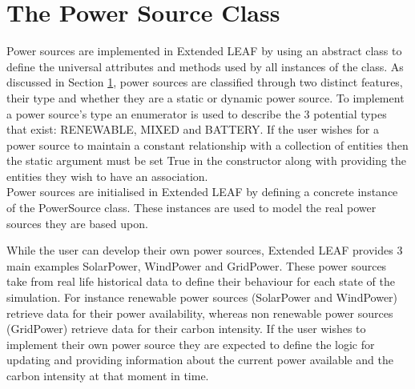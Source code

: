 \documentclass{l4proj}
\begin{document}
\section{The Power Source Class}\label{sec:power-sources}

Power sources are implemented in Extended LEAF by using an abstract class to define the universal attributes and methods used by all instances of the class.
As discussed in Section \ref{sec:power-sources}, power sources are classified through two distinct features, their type and whether they are a static or dynamic power source.
To implement a power source's type an enumerator is used to describe the 3 potential types that exist: RENEWABLE, MIXED and BATTERY.
If the user wishes for a power source to maintain a constant relationship with a collection of entities then the static argument must be set True in the constructor along with providing the entities they wish to have an association.\\
Power sources are initialised in Extended LEAF by defining a concrete instance of the PowerSource class.
These instances are used to model the real power sources they are based upon.

While the user can develop their own power sources, Extended LEAF provides 3 main examples SolarPower, WindPower and GridPower.
These power sources take from real life historical data to define their behaviour for each state of the simulation.
For instance renewable power sources (SolarPower and WindPower) retrieve data for their power availability, whereas non renewable power sources (GridPower) retrieve data for their carbon intensity.
If the user wishes to implement their own power source they are expected to define the logic for updating and providing information about the current power available and the carbon intensity at that moment in time.
\end{document}
